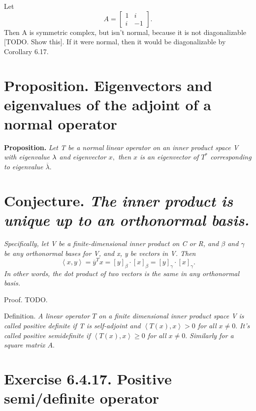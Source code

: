 \documentclass[12pt,english]{article}
\begin{document}
Let
\[
A=\begin{bmatrix}1 & i\\
i & -1
\end{bmatrix}.
\]
Then A is symmetric complex, but isn't normal, because it is not diagonalizable
{[}TODO. Show this{]}. If it were normal, then it would be diagonalizable
by Corollary 6.17.

\section{Proposition. Eigenvectors and eigenvalues of the adjoint of a normal
operator}

\textbf{Proposition. }\emph{Let T be a normal linear operator on an
inner product space V with eigenvalue $\text{\ensuremath{\lambda}}$
and eigenvector $x,$ then $x$ is an eigenvector of $T^{*}$ corresponding
to eigenvalue $\overline{\lambda}.$}

\section{Conjecture. \emph{The inner product is unique up to an orthonormal
basis. }}

\emph{Specifically, let V be a finite-dimensional inner product on
C or R, and $\beta$ and $\gamma$ be any orthonormal bases for V,
and x, y be vectors in V. Then
\[
\left\langle x,y\right\rangle =\overline{y}^{T}x=[y]_{\beta}\cdot[x]_{\beta}=[y]_{\gamma}\cdot[x]_{\gamma}.
\]
In other words, the dot product of two vectors is the same in any
orthonormal basis.}

Proof. TODO.

Definition. \emph{A linear operator $T$ on a finite dimensional inner
product space V is called positive definite if T is self-adjoint and
$\left\langle T(x),x\right\rangle >0$ for all $x\neq0.$ It's called
positive semidefinite if $\left\langle T(x),x\right\rangle \geq0$
for all $x\neq0.$ Similarly for a square matrix $A.$}

\section{Exercise 6.4.17. Positive semi/definite operator}
\end{document}
